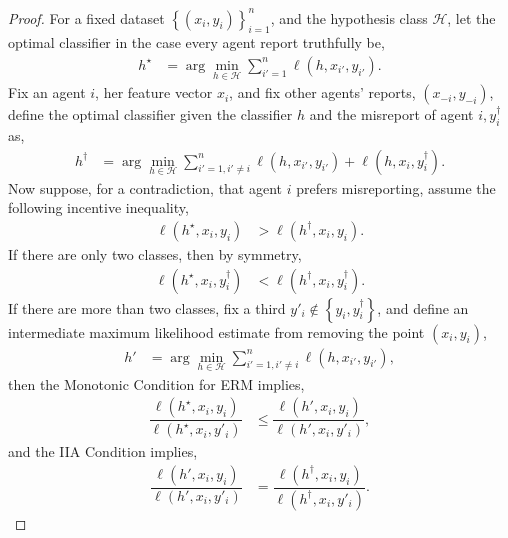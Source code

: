 \documentclass{article}
\begin{document}
\begin{proof} \label{proof:marginermpf} 
For a fixed dataset $\left\{\left(x_{i}, y_{i}\right)\right\}_{i=1}^{n}$, and the hypothesis class $\mathcal{H}$, let the optimal classifier in the case every agent report truthfully be,
\begin{align*}
h^\star  &= \arg\displaystyle\min_{h \in \mathcal{H}} \displaystyle\sum_{i'=1}^{n} \ell\left(h, x_{i'}, y_{i'}\right).
\end{align*}
Fix an agent $i $, her feature vector $x_{i}$, and fix other agents' reports, $\left(x_{-i}, y_{-i}\right)$, define the optimal classifier given the classifier $h $ and the misreport of agent $i , y^{\dagger}_{i}$ as,
\begin{align*}
h^{\dagger} &= \arg\displaystyle\min_{h \in \mathcal{H}} \displaystyle\sum_{i'=1, i' \neq  i}^{n} \ell\left(h, x_{i'}, y_{i'}\right) + \ell\left(h, x_{i}, y^{\dagger}_{i}\right).
\end{align*}
Now suppose, for a contradiction, that agent $i $ prefers misreporting, assume the following incentive inequality,
\begin{align*}
\ell\left(h^\star , x_{i}, y_{i}\right) &> \ell\left(h^{\dagger}, x_{i}, y_{i}\right).
\end{align*}
If there are only two classes, then by symmetry,
\begin{align*}
\ell\left(h^\star , x_{i}, y^{\dagger}_{i}\right) &< \ell\left(h^{\dagger}, x_{i}, y^{\dagger}_{i}\right).
\end{align*}
If there are more than two classes, fix a third $y'_{i} \notin \left\{y_{i}, y^{\dagger}_{i}\right\}$, and define an intermediate maximum likelihood estimate from removing the point $\left(x_{i}, y_{i}\right)$,
\begin{align*}
h' &= \arg\displaystyle\min_{h \in \mathcal{H}} \displaystyle\sum_{i' = 1, i' \neq  i}^{n} \ell\left(h, x_{i'}, y_{i'}\right),
\end{align*}
then the Monotonic Condition for ERM implies,
\begin{align*}
\dfrac{\ell\left(h^\star , x_{i}, y_{i}\right)}{\ell\left(h^\star , x_{i}, y'_{i}\right)} &\leq  \dfrac{\ell\left(h', x_{i}, y_{i}\right)}{\ell\left(h', x_{i}, y'_{i}\right)},
\end{align*}
and the IIA Condition implies,
\begin{align*}
\dfrac{\ell\left(h', x_{i}, y_{i}\right)}{\ell\left(h', x_{i}, y'_{i}\right)} &= \dfrac{\ell\left(h^{\dagger}, x_{i}, y_{i}\right)}{\ell\left(h^{\dagger}, x_{i}, y'_{i}\right)}.

\end{align*}
\end{proof}
\end{document}
